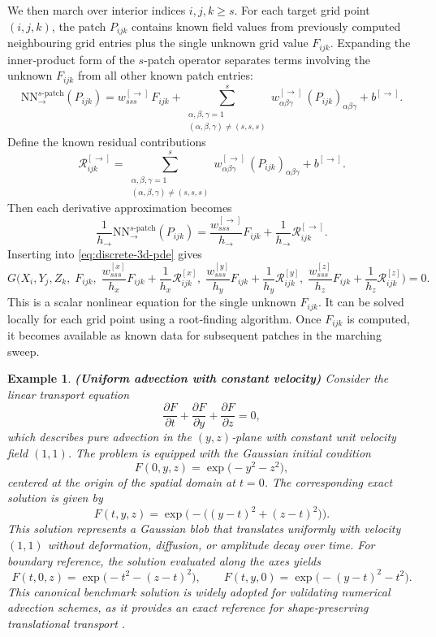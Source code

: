 \documentclass[pdflatex,sn-mathphys-num]{sn-jnl}%
\theoremstyle{thmstyleone}%
\theoremstyle{thmstyletwo}%
\newtheorem{example}{Example}%
\theoremstyle{thmstylethree}%
\begin{document}
{We then march over interior indices $i,j,k \ge s$. For each target grid point $(i,j,k)$, the patch $P_{ijk}$ contains known field values from previously computed neighbouring grid entries plus the single unknown grid value $F_{ijk}$. Expanding the inner‑product form of the $s$-patch operator separates terms involving the unknown $F_{ijk}$ from all other known patch entries:
\[
\mathrm{NN}_{\to}^{s\text{-patch}}(P_{ijk})
= w_{sss}^{[\to]}\,F_{ijk}
+ \sum_{\substack{\alpha,\beta,\gamma=1\\(\alpha,\beta,\gamma)\ne(s,s,s)}}^s w_{\alpha\beta\gamma}^{[\to]}\,(P_{ijk})_{\alpha\beta\gamma}
+ b^{[\to]}.
\]
Define the known residual contributions
\[
\mathcal{R}_{ijk}^{[\to]}
= \sum_{\substack{\alpha,\beta,\gamma=1\\(\alpha,\beta,\gamma)\ne(s,s,s)}}^s w_{\alpha\beta\gamma}^{[\to]}\,(P_{ijk})_{\alpha\beta\gamma}
+ b^{[\to]}.
\]
Then each derivative approximation becomes
\[
\frac{1}{h_\to}\mathrm{NN}_{\to}^{s\text{-patch}}(P_{ijk})
=\frac{w_{sss}^{[\to]}}{h_\to} F_{ijk}
+\frac{1}{h_\to}\mathcal{R}_{ijk}^{[\to]}.
\]
Inserting into \eqref{eq:discrete-3d-pde} gives
\begin{equation}\label{44}
G\biggl(X_i,Y_j,Z_k,\;F_{ijk},\;
\frac{w_{sss}^{[x]}}{h_x}F_{ijk}+\frac{1}{h_x}\mathcal{R}_{ijk}^{[x]},\;
\frac{w_{sss}^{[y]}}{h_y}F_{ijk}+\frac{1}{h_y}\mathcal{R}_{ijk}^{[y]},\;
\frac{w_{sss}^{[z]}}{h_z}F_{ijk}+\frac{1}{h_z}\mathcal{R}_{ijk}^{[z]}
\biggr)=0.
\end{equation}
This is a scalar nonlinear equation for the single unknown $F_{ijk}$. It can be solved locally for each grid point using a root‑finding algorithm. Once $F_{ijk}$ is computed, it becomes available as known data for subsequent patches in the marching sweep.

\begin{example}{\bf (Uniform advection with constant velocity)}
Consider the linear transport equation
\begin{equation}\label{45}
\frac{\partial F}{\partial t}+\frac{\partial F}{\partial y}+\frac{\partial F}{\partial z}=0,
\end{equation}
which describes pure advection in the $(y,z)$‑plane with constant unit velocity field $(1,1)$. The problem is equipped with the Gaussian initial condition
\[
F(0,y,z)=\exp\big(-y^2-z^2\big),
\]
centered at the origin of the spatial domain at $t=0$.
The corresponding exact solution is given by
\[
F(t,y,z)=\exp\Big(-\big((y-t)^2+(z-t)^2\big)\Big).
\]
This solution represents a Gaussian blob that translates uniformly with velocity $(1,1)$ without deformation, diffusion, or amplitude decay over time. For boundary reference, the solution evaluated along the axes yields
\[
F(t,0,z)=\exp\big(-t^2-(z-t)^2\big),\qquad
F(t,y,0)=\exp\big(-(y-t)^2-t^2\big).
\]
This canonical benchmark solution is widely adopted for validating numerical advection schemes, as it provides an exact reference for shape‑preserving translational transport \cite{leveque2002finite}.
\end{example}

}
\end{document}
